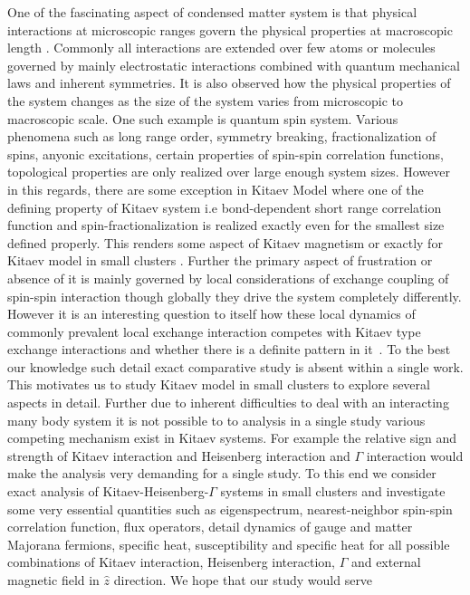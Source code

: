 \documentclass[aps,amsmath,twocolumn,amssymb,floatfix,showpacs,superscriptaddress,nofootinbib,longbibliography]{revtex4-1}
\begin{document}
One of the fascinating aspect of condensed matter system is that physical interactions at microscopic ranges govern the physical properties at macroscopic length \cite{anderson,fifty-years}. Commonly all interactions are extended over few atoms or molecules governed by mainly electrostatic interactions combined with quantum mechanical laws and inherent symmetries. It is also observed how the physical properties of the system changes as the size of the system varies from microscopic to macroscopic scale. One such example is quantum spin system.  Various phenomena such as long range order, symmetry breaking, fractionalization of spins, anyonic excitations, certain properties of spin-spin correlation functions, topological properties are 
only realized over large enough system sizes\cite{savary-review}. However in this regards, there are some exception in Kitaev Model where one of the defining property of Kitaev system i.e bond-dependent short range correlation function and spin-fractionalization is realized exactly even for the smallest size defined properly.  This renders some aspect of Kitaev magnetism or exactly for Kitaev model in small clusters \cite{tathagata-2020,kataoka-jpsj-2020}. Further the primary aspect of frustration or absence of it is mainly governed by local considerations of exchange coupling of spin-spin interaction though globally they drive the system completely differently. However it is an interesting question to itself how these local dynamics of commonly prevalent local exchange interaction competes with Kitaev type exchange interactions and whether there is a definite pattern in it~\cite{wang-2020}. To the best our knowledge such detail exact comparative study is absent within a single work. This motivates us to study Kitaev model in small clusters to explore several aspects in detail. Further due to inherent difficulties to deal with an interacting many body system it is not possible to to analysis in a single study various competing mechanism exist in Kitaev systems. For example the relative sign and strength of Kitaev interaction and Heisenberg interaction and $\Gamma$ interaction would make the analysis very demanding for a single study. To this end we consider exact analysis of Kitaev-Heisenberg-$\Gamma$ systems in small clusters and investigate some very  essential quantities such as eigenspectrum, nearest-neighbor spin-spin correlation function, flux operators, detail dynamics of gauge and matter Majorana fermions, specific heat, susceptibility and specific heat for all possible combinations of Kitaev interaction, Heisenberg interaction, $\Gamma$ and external magnetic field in $\hat{z}$ direction. We hope that our study would serve
\end{document}

